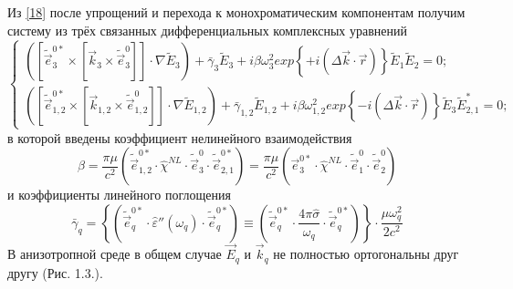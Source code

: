 \documentclass[a4paper]{article}
\begin{document}
 	Из \eqref{18} после упрощений и перехода к монохроматическим компонентам получим систему из трёх связанных дифференциальных комплексных уравнений 
 	\begin{equation}
 		\begin{cases}
 		 		\left(\left[\tilde{\vec{e}}_{3}^{0*}\times\left[\vec{k}_{3}\times\tilde{\vec{e}}_{3}^{0}\right]\right]\cdot\nabla\tilde{E}_{3}\right)+\bar{\gamma}_{3}\tilde{E}_{3}+i\beta\omega_{3}^{2}exp\left\{+i\left(\Delta\vec{k}\cdot\vec{r}\right)\right\}\tilde{E}_{1}\tilde{E}_{2}=0;\\
 				\left(\left[\tilde{\vec{e}}_{1,2}^{0*}\times\left[\vec{k}_{1,2}\times\tilde{\vec{e}}_{1,2}^{0}\right]\right]\cdot\nabla\tilde{E}_{1,2}\right)+\bar{\gamma}_{1,2}\tilde{E}_{1,2}+i\beta\omega_{1,2}^{2}exp\left\{-i\left(\Delta\vec{k}\cdot\vec{r}\right)\right\}\tilde{E}_{3}\tilde{E}_{2,1}^{*}=0;
 		\end{cases}\label{20}
 	\end{equation}
 	в которой введены коэффициент нелинейного взаимодействия  
 	\begin{equation}
 		\beta=\frac{\pi\mu}{c^{2}}(\tilde{\vec{e}}_{1,2}^{0*}\cdot\hat{\chi}^{NL}\cdot\tilde{\vec{e}}_{3}^{0}\cdot\tilde{\vec{e}}_{2,1}^{0*})=\frac{\pi\mu}{c^{2}}(\vec{e}_{3}^{0*}\cdot\hat{\chi}^{NL}\cdot\tilde{\vec{e}}_{1}^{0}\cdot\tilde{\vec{e}}_{2}^{0})
 		\label{20'}\tag{20'}
 	\end{equation}
 	и коэффициенты линейного поглощения
 	\begin{equation}
 		\bar{\gamma}_{q}=\left\{\left(\tilde{\vec{e}}_{q}^{0*}\cdot\hat{\varepsilon}''(\omega_{q})\cdot\tilde{\vec{e}}_{q}^{0*}\right)\equiv\left(\tilde{\vec{e}}_{q}^{0*}\cdot\frac{4\pi\hat{\sigma}}{\omega_{q}}\cdot\tilde{\vec{e}}_{q}^{0*}\right)\right\}\cdot\frac{\mu\omega_{q}^{2}}{2c^{2}}
 		\label{20''}\tag{20''}
 	\end{equation}
 	В анизотропной среде в общем случае $\vec{E}_{q}$ и $\vec{k}_{q}$ не полностью ортогональны друг другу (Рис. 1.3.). 
 	
\end{document}
